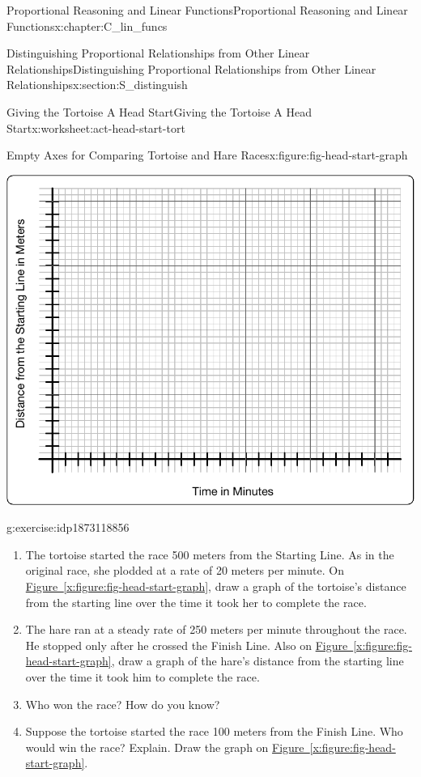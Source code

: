 \documentclass[oneside,10pt,]{book}
\newcommand{\xreffont}{\relax}
\numberwithin{equation}{chapter}
\begin{document}
\begin{chapterptx}{Proportional Reasoning and Linear Functions}{}{Proportional Reasoning and Linear Functions}{}{}{x:chapter:C_lin_funcs}
\begin{sectionptx}{Distinguishing Proportional Relationships from Other Linear Relationships}{}{Distinguishing Proportional Relationships from Other Linear Relationships}{}{}{x:section:S_distinguish}
\begin{worksheet-subsection}{Giving the Tortoise A Head Start}{}{Giving the Tortoise A Head Start}{}{}{x:worksheet:act-head-start-tort}
\begin{introduction}{}
\begin{figureptx}{Empty Axes for Comparing Tortoise and Hare Races}{x:figure:fig-head-start-graph}{}
\begin{image}{0.1}{0.8}{0.1}
\includegraphics[width=\linewidth]{external/head-start-graph.pdf}
\end{image}%
\tcblower
\end{figureptx}%
\end{introduction}%
\begin{divisionexercise}{1}{}{}{g:exercise:idp1873118856}%
\begin{enumerate}[font=\bfseries,label=(\alph*),ref=\alph*]
\item\label{x:task:exer-tort-fhund}The tortoise started the race 500 meters from the Starting Line. As in the original race, she plodded at a rate of 20 meters per minute. On \hyperref[x:figure:fig-head-start-graph]{Figure~{\xreffont\ref{x:figure:fig-head-start-graph}}}, draw a graph of the tortoise's distance from the starting line over the time it took her to complete the race.%
\item{}The hare ran at a steady rate of 250 meters per minute throughout the race. He stopped only after he crossed the Finish Line. Also on \hyperref[x:figure:fig-head-start-graph]{Figure~{\xreffont\ref{x:figure:fig-head-start-graph}}}, draw a graph of the hare's distance from the starting line over the time it took him to complete the race.%
\item{}Who won the race? How do you know?%
\item\label{x:task:exer-tort-ohund}Suppose the tortoise started the race 100 meters from the Finish Line. Who would win the race? Explain. Draw the graph on \hyperref[x:figure:fig-head-start-graph]{Figure~{\xreffont\ref{x:figure:fig-head-start-graph}}}.%

\end{enumerate}
\end{divisionexercise}
\end{worksheet-subsection}
\end{sectionptx}
\end{chapterptx}
\end{document}

